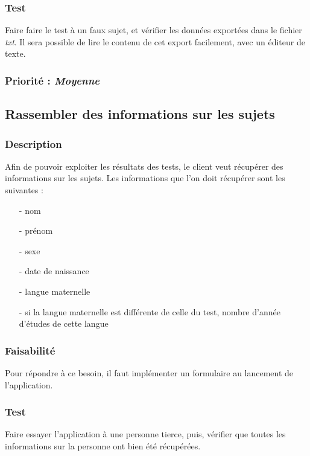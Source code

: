 \subsubsection{Test}

Faire faire le test à un faux sujet, et vérifier les données exportées dans le fichier \textit{txt}. Il sera possible de lire le contenu de cet export facilement, avec un éditeur de texte.

\subsubsection{Priorité : \textit{Moyenne}}

\subsection{Rassembler des informations sur les sujets}

\subsubsection{Description}

Afin de pouvoir exploiter les résultats des tests, le client veut récupérer des informations sur les sujets.
Les informations que l’on doit récupérer sont les suivantes :\\
\begin{itemize}
 \item[-]  nom
 \item[-]  prénom
 \item[-]  sexe
 \item[-]  date de naissance
 \item[-]  langue maternelle
 \item[-]  si la langue maternelle est différente de celle du test, nombre d’année d’études de cette langue
\end{itemize}

\subsubsection{Faisabilité}
  
Pour répondre à ce besoin, il faut implémenter un formulaire au lancement de l’application.

\subsubsection{Test}

Faire essayer l’application à une personne tierce, puis, vérifier que toutes les informations sur la personne ont bien été récupérées.

